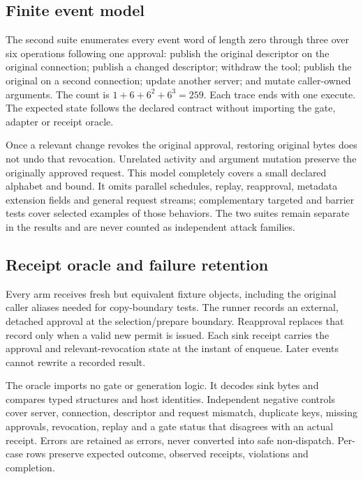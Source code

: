 \subsection{Finite event model}
The second suite enumerates every event word of length zero through three over
six operations following one approval: publish the original descriptor on the
original connection; publish a changed descriptor; withdraw the tool; publish the
original on a second connection; update another server; and mutate caller-owned
arguments. The count is $1+6+6^2+6^3=259$. Each trace ends with one execute.
The expected state follows the declared contract without importing the gate,
adapter or receipt oracle.

Once a relevant change revokes the original approval, restoring original bytes
does not undo that revocation. Unrelated activity and argument mutation preserve
the originally approved request. This model completely covers a small declared
alphabet and bound. It omits parallel schedules, replay, reapproval, metadata
extension fields and general request streams; complementary targeted and barrier
tests cover selected examples of those behaviors. The two suites remain separate
in the results and are never counted as independent attack families.

\subsection{Receipt oracle and failure retention}
Every arm receives fresh but equivalent fixture objects, including the original
caller aliases needed for copy-boundary tests. The runner records an external,
detached approval at the selection/prepare boundary. Reapproval replaces that
record only when a valid new permit is issued. Each sink receipt carries the
approval and relevant-revocation state at the instant of enqueue. Later events
cannot rewrite a recorded result.

The oracle imports no gate or generation logic. It decodes sink bytes and compares
typed structures and host identities. Independent negative controls cover server,
connection, descriptor and request mismatch, duplicate keys, missing approvals,
revocation, replay and a gate status that disagrees with an actual receipt.
Errors are retained as errors, never converted into safe non-dispatch. Per-case
rows preserve expected outcome, observed receipts, violations and completion.

